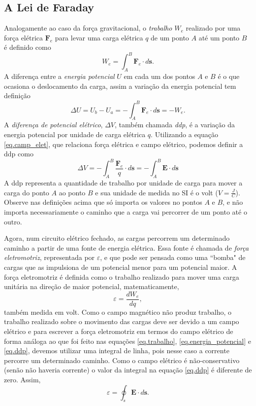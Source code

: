 \subsection{A Lei de Faraday}
Analogamente ao caso da força gravitacional, o \textit{trabalho} $W_e$ realizado por uma força elétrica $\textbf{F}_e$ para levar uma carga elétrica $q$ de um ponto $A$ até um ponto $B$ é definido como
\begin{equation}\label{eq.trabalho}
W_e=\int_{A}^{B}\textbf{F}_e\cdot d\textbf{s}.
\end{equation}
A diferença entre a \textit{energia potencial} $U$ em cada um dos pontos $A$ e $B$ é o que ocasiona o deslocamento da carga, assim a variação da energia potencial tem definição
\begin{equation}\label{eq.energia_potencial}
\Delta U=U_b-U_a=-\int_{A}^{B}\textbf{F}_e\cdot d\textbf{s}=-W_e.
\end{equation}
A \textit{diferença de potencial elétrico}, $\Delta V$, também chamada \textit{ddp}, é a variação da energia potencial por unidade de carga elétrica $q$. Utilizando a equação \ref{eq.camp_elet}, que relaciona força elétrica e campo elétrico, podemos definir a ddp como
\begin{equation}\label{eq.ddp}
\Delta V=-\int_{A}^{B}\frac{\textbf{F}_e}{q}\cdot d\textbf{s}=-\int_{A}^{B}\textbf{E}\cdot d\textbf{s}
\end{equation}
A ddp representa a quantidade de trabalho por unidade de carga para mover a carga do ponto $A$ ao ponto $B$ e sua unidade de medida no SI é o volt ($V=\frac{J}{C}$). Observe nas definições acima que só importa os valores no pontos $A$ e $B$, e não importa necessariamente o caminho que a carga vai percorrer de um ponto até o outro. 

Agora, num circuito elétrico fechado, as cargas percorrem um determinado caminho a partir de uma fonte de energia elétrica. Essa fonte é chamada de \textit{força eletromotriz}, representada por $\varepsilon$, e que pode ser pensada como uma ``bomba" de cargas que as impulsiona de um potencial menor para um potencial maior. A força eletromotriz é definida como o trabalho realizado para mover uma carga unitária na direção de maior potencial, matematicamente,
\begin{equation*}
\varepsilon=\frac{dW_e}{dq}, 
\end{equation*}
também medida em volt. Como o campo magnético não produz trabalho, o trabalho realizado sobre o movimento das cargas deve ser devido a um campo elétrico e para escrever a força eletromotriz em termos do campo elétrico de forma análoga ao que foi feito nas equações \ref{eq.trabalho}, \ref{eq.energia_potencial} e \ref{eq.ddp}, devemos utilizar uma integral de linha, pois nesse caso a corrente percorre um determinado caminho. Como o campo elétrico é não-conservativo (senão não haveria corrente) o valor da integral na equação \ref{eq.ddp} é diferente de zero. Assim,
\begin{equation}\label{eq.emf_E_nc}
\varepsilon=\oint_s\pmb{E}\cdot d\pmb{s}.
\end{equation}
 
